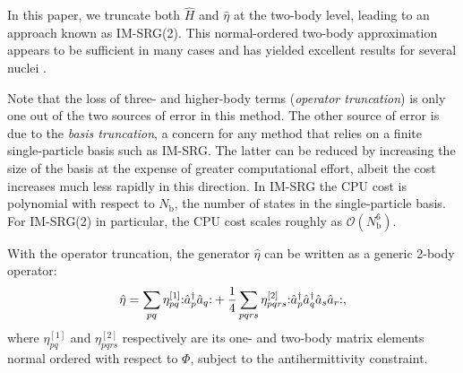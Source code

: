 In this paper, we truncate both $\hat{H}$ and $\hat{\eta}$ at the two-body level, leading to an approach known as IM-SRG(2).  This normal-ordered two-body approximation appears to be sufficient in many cases and has yielded excellent results for several nuclei \cite{PhysRevLett.106.222502,PhysRevLett.109.052501,IMSRG}.

Note that the loss of three- and higher-body terms (\textit{operator truncation}) is only one out of the two sources of error in this method.  The other source of error is due to the \textit{basis truncation}, a concern for any method that relies on a finite single-particle basis such as IM-SRG.  The latter can be reduced by increasing the size of the basis at the expense of greater computational effort, albeit the cost increases much less rapidly in this direction.  In IM-SRG the CPU cost is polynomial with respect to $N_{\mathrm{b}}$, the number of states in the single-particle basis.  For IM-SRG(2) in particular, the CPU cost scales roughly as $\mathcal{O}(N_{\mathrm{b}}^6)$.

With the operator truncation, the generator $\hat{\eta}$ can be written as a generic 2-body operator:
\begin{align*}
\hat{\eta} = \sum_{p q} \eta_{p q}^{[1]} \mathopen: \hat a_p^\dagger \hat a_q \mathclose: +
\frac{1}{4} \sum_{p q r s}\eta_{p q r s}^{[2]} \mathopen: \hat a_p^\dagger \hat a_q^\dagger \hat a_s \hat a_r \mathclose:,
\end{align*}
where $\eta_{p q}^{[1]}$ and $ \eta_{p q r s}^{[2]}$ respectively are its one- and two-body matrix elements normal ordered with respect to $\Phi$, subject to the antihermittivity constraint.

